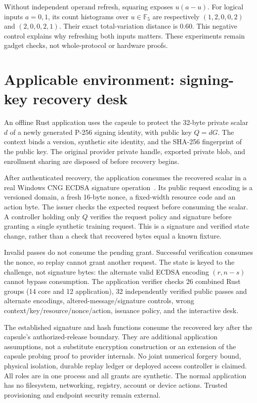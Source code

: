 \documentclass[11pt]{article}
\begin{document}
Without independent operand refresh, squaring exposes $u(a-u)$. For logical
inputs $a=0,1$, its count histograms over $u\in\mathbb F_5$ are respectively
$(1,2,0,0,2)$ and $(2,0,0,2,1)$. Their exact total-variation distance is $0.60$.
This negative control explains why refreshing both inputs matters. These
experiments remain gadget checks, not whole-protocol or hardware proofs.

\section{Applicable environment: signing-key recovery desk}
An offline Rust application uses the capsule to protect the 32-byte private
scalar $d$ of a newly generated P-256 signing identity, with public key $Q=dG$.
The context binds a version, synthetic site identity, and the SHA-256
fingerprint of the public key. The original provider private handle, exported
private blob, and enrollment sharing are disposed of before recovery begins.

After authenticated recovery, the application consumes the recovered scalar
in a real Windows CNG ECDSA signature operation~\cite{cng,nistdss}. Its public
request encoding is a versioned domain, a fresh 16-byte nonce, a fixed-width
resource code and an action byte. The issuer checks the expected request
before consuming the scalar. A controller holding only $Q$ verifies the
request policy and signature before granting a single synthetic training
request. This is a signature and verified state change, rather than a check
that recovered bytes equal a known fixture.

Invalid passes do not consume the pending grant. Successful verification
consumes the nonce, so replay cannot grant another request. The state is keyed
to the challenge, not signature bytes: the alternate valid ECDSA encoding
$(r,n-s)$ cannot bypass consumption. The application verifier checks 26 combined
Rust groups (14 core and 12 application), 32 independently verified public
passes and alternate encodings, altered-message/signature controls, wrong
context/key/resource/nonce/action, issuance policy, and the interactive desk.

The established signature and hash functions consume the recovered key after
the capsule's authorized-release boundary. They are additional application
assumptions, not a substitute encryption construction or an extension of the
capsule probing proof to provider internals. No joint numerical forgery bound,
physical isolation, durable replay ledger or deployed access controller is
claimed. All roles are in one process and all grants are synthetic. The
normal application has no filesystem, networking, registry, account or device
actions. Trusted provisioning and endpoint security remain external.
\end{document}
